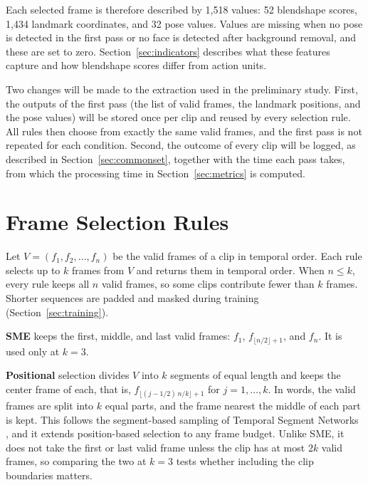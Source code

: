 Each selected frame is therefore described by 1,518 values: 52 blendshape scores, 1,434 landmark coordinates, and 32 pose values. Values are missing when no pose is detected in the first pass or no face is detected after background removal, and these are set to zero. Section~\ref{sec:indicators} describes what these features capture and how blendshape scores differ from action units.

Two changes will be made to the extraction used in the preliminary study. First, the outputs of the first pass (the list of valid frames, the landmark positions, and the pose values) will be stored once per clip and reused by every selection rule. All rules then choose from exactly the same valid frames, and the first pass is not repeated for each condition. Second, the outcome of every clip will be logged, as described in Section~\ref{sec:commonset}, together with the time each pass takes, from which the processing time in Section~\ref{sec:metrics} is computed.



\section{Frame Selection Rules}
\label{sec:selection}

Let $V = (f_1, f_2, \dots, f_n)$ be the valid frames of a clip in temporal order. Each rule selects up to $k$ frames from $V$ and returns them in temporal order. When $n \le k$, every rule keeps all $n$ valid frames, so some clips contribute fewer than $k$ frames. Shorter sequences are padded and masked during training (Section~\ref{sec:training}).

\textbf{SME} keeps the first, middle, and last valid frames: $f_1$, $f_{\lfloor n/2 \rfloor + 1}$, and $f_n$. It is used only at $k = 3$.

\textbf{Positional} selection divides $V$ into $k$ segments of equal length and keeps the center frame of each, that is, $f_{\lfloor (j - 1/2)\,n/k \rfloor + 1}$ for $j = 1, \dots, k$. In words, the valid frames are split into $k$ equal parts, and the frame nearest the middle of each part is kept. This follows the segment-based sampling of Temporal Segment Networks \cite{wang2016}, and it extends position-based selection to any frame budget. Unlike SME, it does not take the first or last valid frame unless the clip has at most $2k$ valid frames, so comparing the two at $k = 3$ tests whether including the clip boundaries matters.


